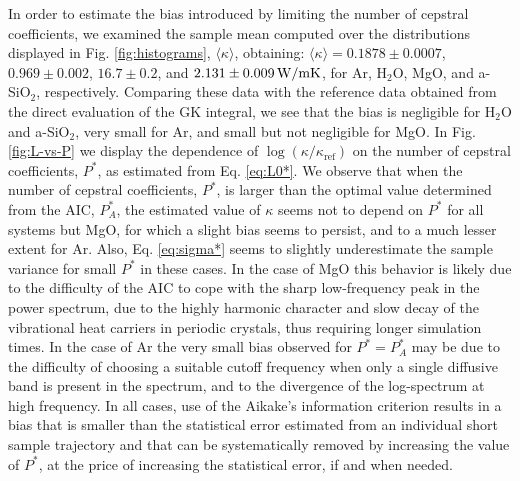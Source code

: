 In order to estimate the bias introduced by limiting the number of cepstral coefficients, we examined the sample mean computed over the distributions displayed in Fig. \ref{fig:histograms}, $\langle\kappa\rangle$, obtaining: $\langle\kappa\rangle = 0.1878 \pm 0.0007$, $0.969 \pm 0.002$, $16.7 \pm 0.2$, and $2.131 \pm 0.009 \,\mathrm{W/mK}$, for Ar, H$_2$O, MgO, and a-SiO$_2$, respectively. Comparing these data with the reference data obtained from  the direct evaluation of the GK integral, we see that the bias is negligible for H$_2$O and a-SiO$_2$, very small for Ar, and small but not negligible for MgO. In Fig. \ref{fig:L-vs-P} we display the dependence of $\log(\kappa/\kappa_{\mathrm{ref}})$ on the number of cepstral coefficients, $P^*$, as estimated from Eq. \eqref{eq:L0*}. We observe that when the number of cepstral coefficients, $P^*$, is larger than the optimal value determined from the AIC, $P_A^*$, the estimated value of $\kappa$ seems not to depend on $P^*$ for all systems but MgO, for which a slight bias seems to persist, and to a much lesser extent for Ar. Also, Eq. \eqref{eq:sigma*} seems to slightly underestimate the sample variance for small $P^*$ in these cases. In the case of MgO this behavior is likely due to the difficulty of the AIC to cope with the sharp low-frequency peak in the power spectrum, due to the highly harmonic character and slow decay of the vibrational heat carriers in periodic crystals,\cite{Carbogno2017} thus requiring longer simulation times. In the case of Ar the very small bias observed for $P^* =P^*_A$ may be due to the difficulty of choosing a suitable cutoff frequency when only a single diffusive band is present in the spectrum, and to the divergence of the log-spectrum at high frequency. In all cases, use of the Aikake's information criterion results in a bias that is smaller than the statistical error estimated from an individual short sample trajectory and that can be systematically removed by increasing the value of $P^*$, at the price of increasing the statistical error, if and when needed.

